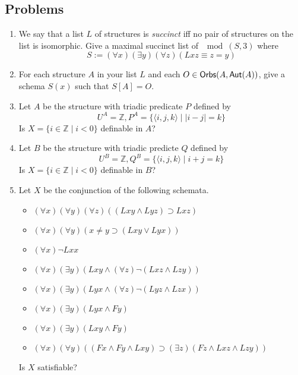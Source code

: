 \newpage
\begin{mdframed}[linewidth=1]
\section*{Problems}
\begin{enumerate}
    \item We say that a list $L$ of structures is \emph{succinct} iff no pair of structures on the list is isomorphic. Give a maximal succinct list of $\mod(S, 3)$ where 
    \[
        S := (\forall x)(\exists y)(\forall z)(Lxz \equiv z = y)
    \]

    \item For each structure $A$ in your list $L$ and each $O \in \mbox{$\mathsf{Orbs}(A,\mbox{$\mathsf{Aut}(A)$})$}$, give a schema $S(x)$ such that $S[A] = O$. 

    \item Let $A$ be the structure with triadic predicate $P$ defined by 
    \[
        U^A = \mathbb{Z}, P^A = \{\langle i, j, k \rangle \mid |i - j| = k\}
    \]
    Is $X = \{i \in \mathbb{Z} \mid i < 0\}$ definable in $A$?

    \item Let $B$ be the structure with triadic predicte $Q$ defined by
    \[
        U^B = \mathbb{Z}, Q^B = \{\langle i, j, k \rangle \mid i + j = k\}
    \]
    Is $X = \{i \in \mathbb{Z} \mid i < 0\}$ definable in $B$?

    \item 
Let $X$ be the conjunction of the following schemata.
\begin{itemize}
\item 
$(\forall x)(\forall y)(\forall z)((Lxy \wedge Lyz) \supset Lxz)$
\item
$(\forall x)(\forall y)(x\neq y\supset(Lxy \vee Lyx))$
\item
$(\forall x) \neg Lxx$
\item 
$(\forall x)(\exists y)(Lxy\wedge (\forall z)\neg (Lxz\wedge Lzy))$
\item 
$(\forall x)(\exists y)(Lyx\wedge (\forall z)\neg (Lyz\wedge Lzx))$
\item
$(\forall x)(\exists y)(Lyx\wedge Fy)$
\item
$(\forall x)(\exists y)(Lxy\wedge Fy)$
\item
$(\forall x)(\forall y)((Fx\wedge Fy\wedge Lxy)\supset (\exists z)(Fz\wedge Lxz\wedge Lzy))$
\end{itemize}

Is $X$ satisfiable?
    

\end{enumerate}
\end{mdframed}
